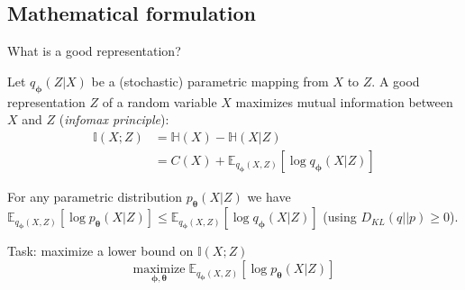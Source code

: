 \documentclass{beamer}
\begin{document}
  \subsection{Mathematical formulation}

  \begin{frame}{What is a good representation?}

    
    \small{Let $q_{\boldsymbol{\phi}}(Z|X)$ be a (stochastic) parametric mapping from $X$ to $Z$. A good representation $Z$ of a random variable $X$ maximizes \alert{mutual information} between $X$ and $Z$ (\emph{infomax principle}):}
    \vspace{0cm}
    \begin{align*}
      \mathbb{I}(X;Z) &= \mathbb{H}(X) - \mathbb{H}(X|Z)\\
                      &= C(X) + \mathbb{E}_{q_{\boldsymbol{\phi}}(X,Z)}\left[\log q_{\boldsymbol{\phi}}(X|Z)\right]
    \end{align*}

    \small{For any parametric distribution $p_{\boldsymbol{\theta}}(X|Z)$ we have $\mathbb{E}_{q_{\boldsymbol{\phi}}(X,Z)}\left[\log p_{\boldsymbol{\theta}}(X|Z)\right] \leq \mathbb{E}_{q_{\boldsymbol{\phi}}(X,Z)}\left[\log q_{\boldsymbol{\phi}}(X|Z)\right]$ (using $D_{KL}(q||p) \geq 0$).}

    \begin{block}{Task: maximize a lower bound on $\mathbb{I}(X;Z)$}
      \begin{equation*}
        \underset{\boldsymbol{\phi},\boldsymbol{\theta}}{\text{maximize}} \; \mathbb{E}_{q_{\boldsymbol{\phi}}(X,Z)}\left[\log p_{\boldsymbol{\theta}}(X|Z)\right]
      \end{equation*}
    \end{block}

  \end{frame}
\end{document}
